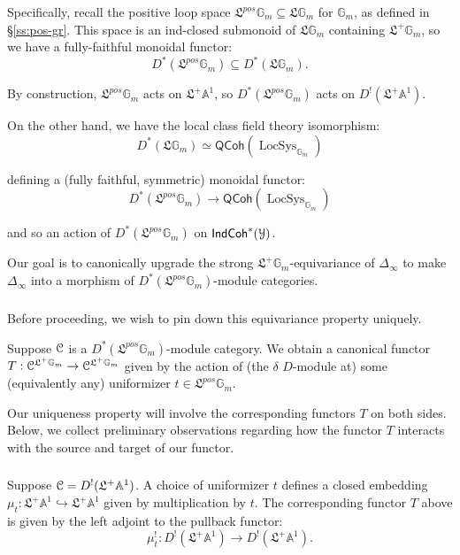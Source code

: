 \documentclass[reqno,11pt]{amsart}
\numberwithin{equation}{subsection}
\theoremstyle{remark}
\newcommand{\into}{\hookrightarrow}
\newcommand{\bA}{{\mathbb A}}
\newcommand{\bG}{{\mathbb G}}
\newcommand{\sC}{{\EuScript C}}
\newcommand{\sY}{{\EuScript Y}}
\newcommand{\fL}{{\mathfrak L}}
\newcommand{\on}{\operatorname}
\newcommand{\LocSys}{\on{LocSys}}
\newcommand{\IndCoh}{\mathsf{IndCoh}}
\newcommand{\QCoh}{\mathsf{QCoh}}
\renewcommand{\subset}{\subseteq}
\begin{document}
Specifically, recall the positive loop space $\fL^{pos} \bG_m \subset \fL \bG_m$ 
for $\bG_m$, as defined in \S \ref{ss:pos-gr}. 
This space is an ind-closed submonoid of $\fL \bG_m$ containing
$\fL^+\bG_m$, so we have 
a fully-faithful monoidal functor:
%
\[
D^*(\fL^{pos} \bG_m) \subset D^*(\fL \bG_m).
\]

By construction, $\fL^{pos} \bG_m$ acts on $\fL^+\bA^1$, so 
$D^*(\fL^{pos} \bG_m)$ acts on $D^!(\fL^+\bA^1)$.

On the other hand, we have the local class field theory isomorphism:
%
\[
D^*(\fL \bG_m) \simeq \QCoh(\LocSys_{\bG_m})
\]

\noindent defining a (fully faithful, symmetric) monoidal functor:
%
\[
D^*(\fL^{pos} \bG_m) \to \QCoh(\LocSys_{\bG_m})
\]

\noindent and so an action of $D^*(\fL^{pos} \bG_m)$ on 
$\IndCoh^*(\sY)$.

Our goal is to canonically upgrade the strong 
$\fL^+\bG_m$-equivariance of $\Delta_{\infty}$ to make $\Delta_{\infty}$
into a morphism of $D^*(\fL^{pos} \bG_m)$-module categories.

\subsubsection{}

Before proceeding, we wish to pin down this equivariance property uniquely.

Suppose $\sC$ is a $D^*(\fL^{pos} \bG_m)$-module category. 
We obtain a canonical functor $T:\sC^{\fL^+\bG_m} \to \sC^{\fL^+\bG_m}$
given by the action of (the $\delta$ $D$-module at) 
some (equivalently any) uniformizer $t \in \fL^{pos} \bG_m$.

Our uniqueness property will involve the corresponding functors $T$ on both
sides. Below, we collect preliminary observations regarding how the
functor $T$ interacts with the source and target of our functor. 

\subsubsection{} 

Suppose $\sC = D^!(\fL^+\bA^1)$. A choice of uniformizer $t$ defines
a closed embedding $\mu_t:\fL^+\bA^1 \into \fL^+ \bA^1$ given by multiplication
by $t$. The corresponding functor $T$ above is given by the left adjoint
to the pullback functor:
%
\[
\mu_t^!:D^!(\fL^+\bA^1) \to D^!(\fL^+ \bA^1).
\]
\end{document}
